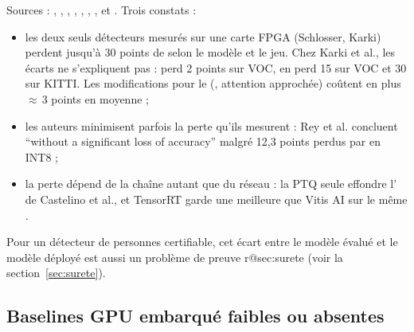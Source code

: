 Sources : \citet{arxiv-2304.11580-framework-benchmarking-real-time-embedded},
\citet{arxiv-2607.13106-no-attention-no-problem-dpu}\pp,
\citet{arxiv-2502.15737-performance-analysis-you-only-look},
\citet{2022-feng-benchmark-analysis-yolo-performance-edge},
\citet{arxiv-2407.17647-energy-efficient-artefact-detection-accelerator},
\citet{arxiv-1909.09709-skynet-hardware-efficient-method-object}\pp,
\citet{arxiv-2403.18921-smof-streaming-modern-cnns-fpgas}\pp,
\citet{2022-malviya-edge-compatible-convolutional-autoencoder-implemented} et
\citet{2019-coutinho-deep-neural-network-hardware-implementation}. Trois constats :
\begin{itemize}
  \item les deux seuls détecteurs mesurés sur une carte FPGA (Schlosser, Karki\pp) perdent
    jusqu'à 30 points de  selon le modèle et le jeu. Chez Karki et al., les
    écarts ne s'expliquent pas :  perd 2 points sur VOC,  en perd 15 sur VOC
    et 30 sur KITTI. Les modifications pour le  (, attention approchée) coûtent
    en plus $\approx$\,3 points en moyenne  ;
  \item les auteurs minimisent parfois la perte qu'ils mesurent : Rey et al. concluent
    \enquote{without a significant loss of accuracy}  malgré 12,3 points perdus
    par  en INT8 ;
  \item la perte dépend de la chaîne autant que du réseau : la PTQ seule effondre
    l' de Castelino et al., et TensorRT garde une meilleure  que Vitis AI
    sur le même .
\end{itemize}
Pour un détecteur de personnes certifiable, cet écart entre le modèle évalué et le modèle
déployé est aussi un problème de preuve \deduit\ifcsname r@sec:surete\endcsname{} (voir la
section~\ref{sec:surete})\fi.

\subsection{Baselines GPU embarqué faibles ou absentes}

